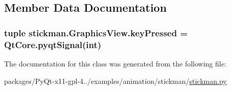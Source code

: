 \subsection{Member Data Documentation}
\hypertarget{classstickman_1_1GraphicsView_a2307efe8ba0a3b22b65b6020b789933b}{}
\subsubsection[{key\+Pressed}]{\setlength{\rightskip}{0pt plus 5cm}tuple stickman.\+Graphics\+View.\+key\+Pressed = Qt\+Core.\+pyqt\+Signal(int)\hspace{0.3cm}{\ttfamily [static]}}\label{classstickman_1_1GraphicsView_a2307efe8ba0a3b22b65b6020b789933b}


The documentation for this class was generated from the following file\+:\begin{DoxyCompactItemize}
\item 
packages/\+Py\+Qt-\/x11-\/gpl-\/4../examples/animation/stickman/\hyperlink{stickman_8py}{stickman.\+py}\end{DoxyCompactItemize}
